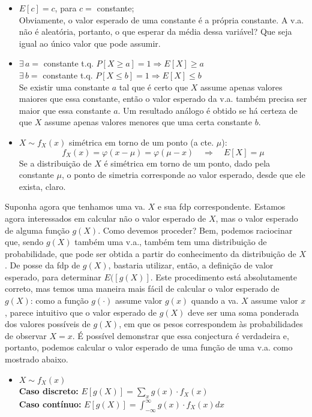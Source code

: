 \documentclass[
]{book}
\providecommand{\tightlist}{%
  \setlength{\itemsep}{0pt}\setlength{\parskip}{0pt}}
\theoremstyle{definition}
\theoremstyle{definition}
\theoremstyle{definition}
\theoremstyle{remark}
\begin{document}
\begin{itemize}
\item
  \({E[c] = c}\), para \({c =}\) constante;\\
  Obviamente, o valor esperado de uma constante é a própria constante. A v.a. não é aleatória, portanto, o que esperar da média dessa variável? Que seja igual ao único valor que pode assumir.
\item
  \({\exists \,a = }\) constante t.q. \({P[X\geq a] = 1 \Longrightarrow E[X] \geq a}\)\\
  \({\exists \,b = }\) constante t.q. \({P[X\leq b] = 1 \Longrightarrow E[X] \leq b}\)\\
  Se existir uma constante \(a\) tal que é certo que \(X\) assume apenas valores maiores que essa constante, então o valor esperado da v.a. também precisa ser maior que essa constante \(a\). Um resultado análogo é obtido se há certeza de que \(X\) assume apenas valores menores que uma certa constante \(b\).
\item
  \({X \sim f_X(x)}\) simétrica em torno de um ponto (a cte. \({\mu}\)):
  \[{f_X(x) = \varphi(x-\mu) = \varphi(\mu-x) \quad \Longrightarrow \quad E[X] = \mu}\]
  Se a distribuição de \(X\) é simétrica em torno de um ponto, dado pela constante \(\mu\), o ponto de simetria corresponde ao valor esperado, desde que ele exista, claro.
\end{itemize}

Suponha agora que tenhamos uma va. \(X\) e sua fdp correspondente. Estamos agora interessados em calcular não o valor esperado de \(X\), mas o valor esperado de alguma função \(g(X)\). Como devemos proceder? Bem, podemos raciocinar que, sendo \(g(X)\) também uma v.a., também tem uma distribuição de probabilidade, que pode ser obtida a partir do conhecimento da distribuição de \(X\). De posse da fdp de \(g(X)\), bastaria utilizar, então, a definição de valor esperado, para determinar \(E([g(X)]\). Este procedimento está absolutamente correto, mas temos uma maneira mais fácil de calcular o valor esperado de \(g(X)\): como a função \(g(\cdot)\) assume valor \(g(x)\) quando a va. \(X\) assume valor \(x\), parece intuitivo que o valor esperado de \(g(X)\) deve ser uma soma ponderada dos valores possíveis de \(g(X)\), em que os pesos correspondem às probabilidades de observar \(X=x\). É possível demonstrar que essa conjectura é verdadeira e, portanto, podemos calcular o valor esperado de uma função de uma v.a. como mostrado abaixo.

\begin{itemize}
\tightlist
\item
  \({X \sim f_X(x)}\)\\
  \textbf{Caso discreto:} \({E[g(X)] = \sum_x g(x)\cdot f_X(x)}\)\\
  \textbf{Caso contínuo:} \({E[g(X)] = \int_{-\infty}^{\infty} g(x) \cdot f_X(x) dx}\)
\end{itemize}
\end{document}
